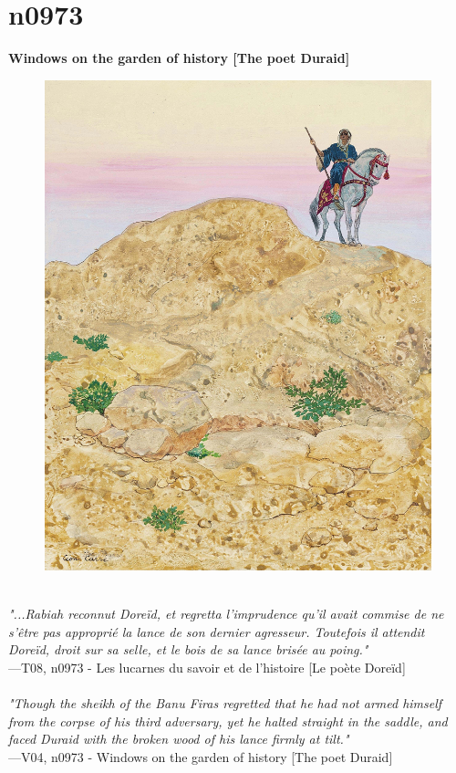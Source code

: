 \documentclass[../Carre_nights.tex]{subfiles}
\begin{document}
\newpage

\section{n0973}
\textbf{\Large{Windows on the garden of history [The poet Duraid]}} \\

\begin{figure}[ht]
\centering
\includegraphics[height=\figsize]{illustrations/volume_8/T08, n0973 - Les lucarnes du savoir et de l'histoire [Le poète Doreïd].jpg}
\end{figure}

\textit{\\
"...Rabiah reconnut Doreïd, et regretta l’imprudence qu’il avait commise de ne s’être pas approprié la lance de son dernier agresseur. Toutefois il attendit Doreïd, droit sur sa selle, et le bois de sa lance brisée au poing."} \\
—T08, n0973 - Les lucarnes du savoir et de l'histoire [Le poète Doreïd] \\~\\
\textit{"Though the sheikh of the Banu Firas regretted that he had not armed himself from the corpse of his third adversary, yet he halted straight in the saddle, and faced Duraid with the broken wood of his lance firmly at tilt."} \\
—V04, n0973 - Windows on the garden of history [The poet Duraid]
\end{document}
